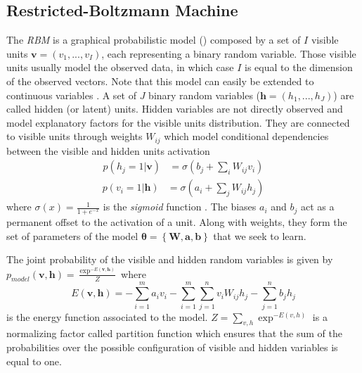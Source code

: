 \documentclass[letterpaper]{article}
\begin{document}
\subsection{Restricted-Boltzmann Machine}
The \textit{RBM} \cite{hinton2006fast} is a graphical probabilistic model () composed by a set of $I$ visible units $\bm{v} = (v_{1},...,v_{I})$, each representing a binary random variable. Those visible units usually model the observed data, in which case $I$ is equal to the dimension of the observed vectors. Note that this model can easily be extended to continuous variables \cite{hinton2010practical}. A set of $J$ binary random variables ($\bm{h} = (h_{1},...,h_{J})$) are called hidden (or latent) units. Hidden variables are not directly observed and model explanatory factors for the visible units distribution. They are connected to visible units through weights $W_{ij}$ which model conditional dependencies between the visible and hidden units activation
\begin{align}
\label{eq:marginal_RBM_1}
p(h_{j}=1|\bm{v}) &= \sigma \left( b_{j} + \sum_{i}W_{ij}v_{i} \right)
\end{align}
\begin{align}
\label{eq:marginal_RBM_2}
p(v_{i}=1|\bm{h}) &= \sigma \left( a_{i} + \sum_{j}W_{ij}h_{j} \right)
\end{align}
where $\sigma	(x) = \frac{1}{1+e^{-x}}$ is the \textit{sigmoid} function . The biases $a_{i}$ and $b_{j}$ act as a permanent offset to the activation of a unit. Along with weights, they form the set of parameters of the model $\bm{\theta} = \left\lbrace \bm{W} , \bm{a} , \bm{b} \right\rbrace$ that we seek to learn.

The joint probability of the visible and hidden random variables is given by $p_{model}(\bm{v},\bm{h}) = \frac{\exp^{-E(\bm{v},\bm{h})}}{Z}$ where
\begin{equation}
\label{eq:energy}
E(\bm{v},\bm{h}) = - \sum_{i=1}^{m} a_{i} v_{i}  - \sum_{i=1}^{m} \sum_{j=1}^{n} v_{i} W_{ij} h_{j} - \sum_{j = 1}^{n} b_{j} h_{j}
\end{equation}
is the energy function associated to the model. $Z = \sum_{v,h}\exp^{-E(v,h)}$ is a normalizing factor called partition function which ensures that the sum of the probabilities over the possible configuration of visible and hidden variables is equal to one.
\end{document}
